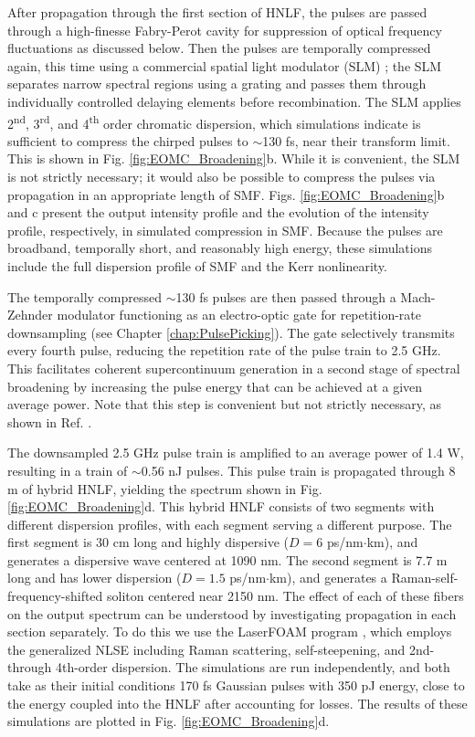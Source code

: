 After propagation through the first section of HNLF, the pulses are passed through a high-finesse Fabry-Perot cavity for suppression of optical frequency fluctuations as discussed below. Then the pulses are temporally compressed again, this time using a commercial spatial light modulator (SLM) \cite{Weiner2000}; the SLM separates narrow spectral regions using a grating and passes them through individually controlled delaying elements before recombination. The SLM applies 2\textsuperscript{nd}, 3\textsuperscript{rd}, and 4\textsuperscript{th} order chromatic dispersion, which simulations indicate is sufficient to compress the chirped pulses to $\sim$130 fs, near their transform limit. This is shown in Fig. \ref{fig:EOMC_Broadening}b. While it is convenient, the SLM is not strictly necessary; it would also be possible to compress the pulses via propagation in an appropriate length of SMF. Figs. \ref{fig:EOMC_Broadening}b and c present the output intensity profile and the evolution of the intensity profile, respectively, in simulated compression in SMF. Because the pulses are broadband, temporally short, and reasonably high energy, these simulations include the full dispersion profile of SMF and the Kerr nonlinearity.



The temporally compressed $\sim$130 fs pulses are then passed through a Mach-Zehnder modulator functioning as an electro-optic gate for repetition-rate downsampling (see Chapter \ref{chap:PulsePicking}). The gate selectively transmits every fourth pulse, reducing the repetition rate of the pulse train to 2.5 GHz. This facilitates coherent supercontinuum generation in a second stage of spectral broadening by increasing the pulse energy that can be achieved at a given average power. Note that this step is convenient but not strictly necessary, as shown in Ref. \cite{Beha2017}. 

The downsampled 2.5 GHz pulse train is amplified to an average power of 1.4 W, resulting in a train of $\sim$0.56 nJ pulses. This pulse train is propagated through 8 m of hybrid HNLF, yielding the spectrum shown in Fig. \ref{fig:EOMC_Broadening}d. This hybrid HNLF consists of two segments with different dispersion profiles, with each segment serving a different purpose. The first segment is 30 cm long and highly dispersive ($D=6$  ps/nm$\cdot$km), and generates a dispersive wave centered at 1090 nm. The second segment is 7.7 m long and has lower dispersion ($D=1.5$  ps/nm$\cdot$km), and generates a Raman-self-frequency-shifted soliton centered near 2150 nm. The effect of each of these fibers on the output spectrum can be understood by investigating propagation in each section separately. To do this we use the LaserFOAM program \cite{Amorim2009}, which employs the generalized NLSE including Raman scattering, self-steepening, and 2nd- through 4th-order dispersion. The simulations are run independently, and both take as their initial conditions 170 fs Gaussian pulses with 350 pJ energy, close to the energy coupled into the HNLF after accounting for losses. The results of these simulations are plotted in Fig. \ref{fig:EOMC_Broadening}d. 

